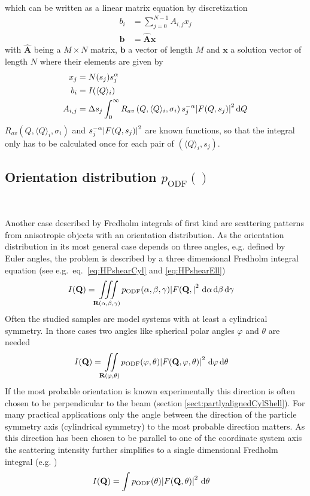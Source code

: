 which can be written as a linear matrix equation by discretization
\begin{align}
\label{eq:discreteFredholm}
b_i &= \sum_{j=0}^{N-1} A_{i,j} x_j \\
\label{eq:discreteFredholmVector}
\mathbf{b} &= \hat{\mathbf{A}}\mathbf{x}
\end{align}
with $\hat{\mathbf{A}}$ being a $M\times N$ matrix, $\mathbf{b}$ a vector of length $M$ and $\mathbf{x}$ a solution vector of length $N$ where their elements are given by
\begin{align}
x_j &= N(s_j) s_j^{\alpha}\\
b_i &= I(\langle Q\rangle_i) \\
A_{i,j} &= \Delta s_j \int_0^\infty R_{av}\left(Q,\langle Q\rangle_i,\sigma_i\right) s_j^{-\alpha} \abs{F(Q,s_j)}^2 \, \mathrm{d}Q  \label{eq:AijFF}
\end{align}
$R_{av}\left(Q,\langle Q\rangle_i,\sigma_i\right)$ and $s_j^{-\alpha}\abs{F(Q,s_j)}^2$ are known functions, so that the integral only has to be calculated once for each pair of $(\langle Q\rangle_i,s_j)$.

\subsection{Orientation distribution $p_\mathrm{ODF}()$} ~\\
\label{sec:pODF}

Another case described by Fredholm integrals of first kind are scattering patterns from anisotropic objects with an orientation distribution. As the orientation distribution in its most general case depends on three angles, e.g. defined by Euler angles, the problem is described by a three dimensional Fredholm integral equation (see e.g.\ eq.\ \ref{eq:HPshearCyl} and \ref{eq:HPshearEll})
\begin{align}\label{eq:FE4ODF_3D}
  I(\mathbf{Q}) &=  \iiint\limits_{\mathbf{R}(\alpha,\beta,\gamma)} p_\mathrm{ODF}(\alpha,\beta,\gamma) \abs{F(\mathbf{Q},}^2\,\, \mathrm{d}\alpha\, \mathrm{d}\beta\, \mathrm{d}\gamma
\end{align}
Often the studied samples are model systems with at least a cylindrical symmetry. In those cases two angles like spherical polar angles $\varphi$ and $\theta$ are needed
\begin{align}\label{eq:FE4ODF_2D}
  I(\mathbf{Q}) &=  \iint\limits_{\mathbf{R}(\varphi,\theta)} p_\mathrm{ODF}(\varphi,\theta) \abs{F(\mathbf{Q},\varphi,\theta)}^2\,\, \mathrm{d}\varphi\, \mathrm{d}\theta
\end{align}
If the most probable orientation is known experimentally this direction is often chosen to be perpendicular to the beam (section \ref{sect:partlyalignedCylShell}). For many practical applications only the angle between the direction of the particle symmetry axis (cylindrical symmetry) to the most probable direction matters. As this direction has been chosen to be parallel to one of the coordinate system axis the scattering intensity further simplifies to a single dimensional Fredholm integral (e.g. \cite{Beck2010})
\begin{align}\label{eq:FE4ODF_1D}
  I(\mathbf{Q}) &=  \int  p_\mathrm{ODF}(\theta) \abs{F(\mathbf{Q},\theta)}^2\,\, \mathrm{d}\theta
\end{align}
